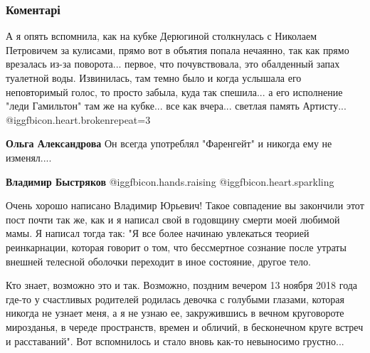  
 
 
 
 
\subsubsection{Коментарі}

\begin{itemize} %

А я опять вспомнила, как на кубке Дерюгиной столкнулась с Николаем Петровичем за
кулисами, прямо вот в объятия попала нечаянно, так как прямо врезалась из-за
поворота... первое, что почувствовала, это обалденный запах туалетной
воды. Извинилась, там темно было и когда услышала его неповторимый голос, то
просто забыла, куда так спешила... а его исполнение "леди Гамильтон" там же на
кубке... все как вчера... светлая память Артисту... @igg{fbicon.heart.broken}{repeat=3} 

\begin{itemize} %
\textbf{Ольга Александрова} Он всегда употреблял "Фаренгейт" и никогда ему не изменял....

\textbf{Владимир Быстряков}  @igg{fbicon.hands.raising}  @igg{fbicon.heart.sparkling} 
\end{itemize} %


Очень хорошо написано Владимир Юрьевич! Такое совпадение вы закончили этот пост
почти так же, как и я написал свой в годовщину смерти моей любимой мамы. Я
написал тогда так: "Я все более начинаю увлекаться теорией реинкарнации,
которая говорит о том, что бессмертное сознание после утраты внешней телесной
оболочки переходит в иное состояние, другое тело.

Кто знает, возможно это и так. Возможно, поздним вечером 13 ноября 2018 года
где-то у счастливых родителей родилась девочка с голубыми глазами, которая
никогда не узнает меня, а я не узнаю ее, закружившись в вечном круговороте
мирозданья, в череде пространств, времен и обличий, в бесконечном круге встреч
и расставаний". Вот вспомнилось и стало вновь как-то невыносимо грустно...


\end{itemize}
